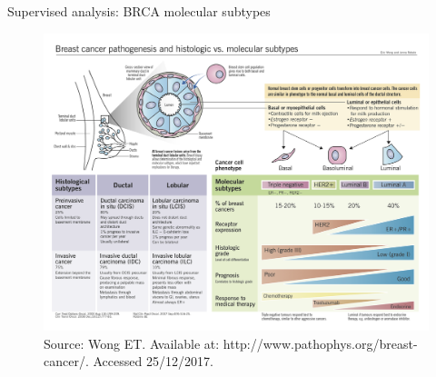 \documentclass[slidestop,compress,11pt,xcolor=dvipsnames]{beamer}
\begin{document}
\begin{frame}[plain]{Supervised analysis: BRCA molecular subtypes}
\vspace*{-0.45cm}
 \begin{figure}[ht!]
  \centering
  \includegraphics[width=1.0\textwidth]{ELMER/breastcancer-subtypes.png}\tiny{\\Source: Wong ET. Available at: http://www.pathophys.org/breast-cancer/. Accessed 25/12/2017.}
 \end{figure}
\end{frame}



\end{document}
